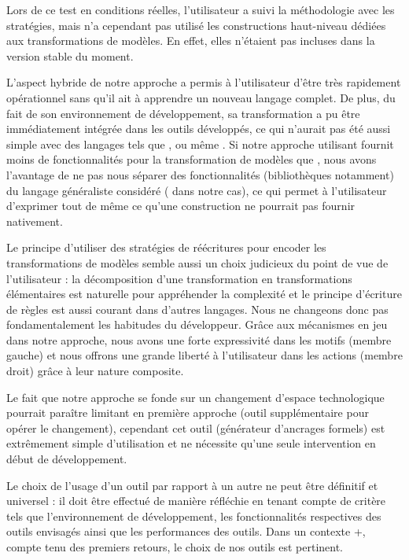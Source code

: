 Lors de ce test en conditions réelles, l'utilisateur a suivi la méthodologie
avec les stratégies, mais n'a cependant pas utilisé les constructions {\tom}
haut-niveau dédiées aux transformations de modèles. En effet, elles n'étaient
pas incluses dans la version stable du moment.

L'aspect hybride de notre approche a permis à l'utilisateur d'être très
rapidement opérationnel sans qu'il ait à apprendre un nouveau langage complet.
De plus, du fait de son environnement de développement, sa transformation a pu
être immédiatement intégrée dans les outils développés, ce qui n'aurait pas été
aussi simple avec des langages tels que {\atl}, {\kermeta} ou même {\stratego}. Si
notre approche utilisant {\tom} fournit moins de fonctionnalités pour la
transformation de modèles que {\atl}, nous avons l'avantage de ne pas nous
séparer des fonctionnalités (bibliothèques notamment) du langage généraliste
considéré ({\java} dans notre cas), ce qui permet à l'utilisateur d'exprimer
tout de même ce qu'une construction {\tom} ne pourrait pas fournir nativement.

Le principe d'utiliser des stratégies de réécritures pour encoder les
transformations de modèles semble aussi un choix judicieux du point de vue
de l'utilisateur : la décomposition d'une transformation en transformations
élémentaires est naturelle pour appréhender la complexité et le principe
d'écriture de règles est aussi courant dans d'autres langages. Nous ne
changeons donc pas fondamentalement les habitudes du développeur. Grâce aux
mécanismes en jeu dans notre approche, nous avons une forte expressivité dans
les motifs (membre gauche) et nous offrons une grande liberté à l'utilisateur
dans les actions (membre droit) grâce à leur nature composite. 

Le fait que notre approche se fonde sur un changement d'espace technologique
pourrait paraître limitant en première approche (outil supplémentaire pour
opérer le changement), cependant cet outil (générateur d'ancrages formels) est 
extrêmement simple d'utilisation et ne nécessite qu'une seule intervention en
début de développement.

Le choix de l'usage d'un outil par rapport à un autre ne peut être définitif et
universel : il doit être effectué de manière réfléchie en tenant compte de
critère tels que l'environnement de développement, les fonctionnalités
respectives des outils envisagés ainsi que les performances des outils. Dans un
contexte {\java}+{\emf}, compte tenu des premiers retours, le choix de nos
outils est pertinent. 

